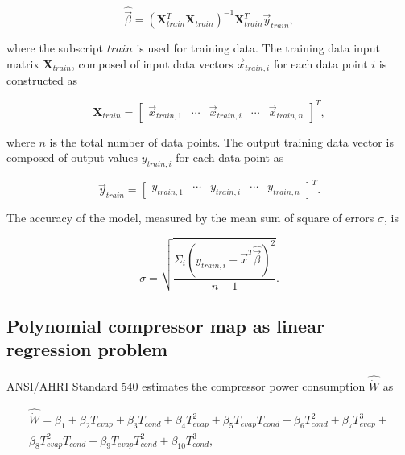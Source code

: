 \begin{equation}
\hat {\vec \beta}  = {({\mathbf{X}}_{train}^T{{\mathbf{X}}_{train}})^{ - 1}}{\mathbf{X}}_{train}^T{\vec y_{train}},
\label{eq:estimte_parameters}
\end{equation}

where the subscript $train$ is used for training data. The training data input matrix ${{\mathbf{X}}_{train}}$, composed of input data vectors ${\vec x}_{train,i}$ for each data point $i$ is constructed as

\begin{equation}
 {{\mathbf{X}}_{train}} = {\left[ {\begin{array}{*{20}{c}} {{{\vec x}_{train,1}}}& \cdots &{{{\vec x}_{train,i}}}& \cdots &{{{\vec x}_{train,n}}}
\end{array}} \right]^T},
\label{eq:input_tr_matrix}
\end{equation}

where $n$ is the total number of data points. The output training data vector is composed of output values $y_{train,i}$ for each data point as

\begin{equation}
{\vec y_{train}} = {\left[ {\begin{array}{*{20}{c}}
  {{y_{train,1}}}& \cdots &{{y_{train,i}}}& \cdots &{{y_{train,n}}} 
\end{array}} \right]^T}.
\label{eq:output_tr_vector}
\end{equation}

The accuracy of the model, measured by the mean sum of square of errors $\sigma$, is 

\begin{equation}
\sigma  = \sqrt {\frac {{\Sigma _i}{{({y_{train,i}} - {{\vec x}^T}\hat {\vec \beta} )}^2}} {n - 1}}.
\label{eq:acc_est_model}
\end{equation}

\subsection{Polynomial compressor map as linear regression problem}
\label{sec:linreg_compmap}
ANSI/AHRI Standard 540 \cite{AHRI:540} estimates the compressor power consumption $\hat {\dot W}$ as

\begin{equation}
\begin{gathered}
  \hat {\dot W} = {\beta _1} + {\beta _2}{T_{evap}} + {\beta _3}{T_{cond}} + {\beta _4}T_{evap}^2 + {\beta _5}{T_{evap}}{T_{cond}} + {\beta _6}T_{cond}^2 + {\beta _7}T_{evap}^3 + \\
  {\beta _8}T_{evap}^2{T_{cond}} + {\beta _9}{T_{evap}}T_{cond}^2   + {\beta _{10}}T_{cond}^3 ,
\end{gathered} 
\label{eq:pwr_map_definition}
\end{equation}


